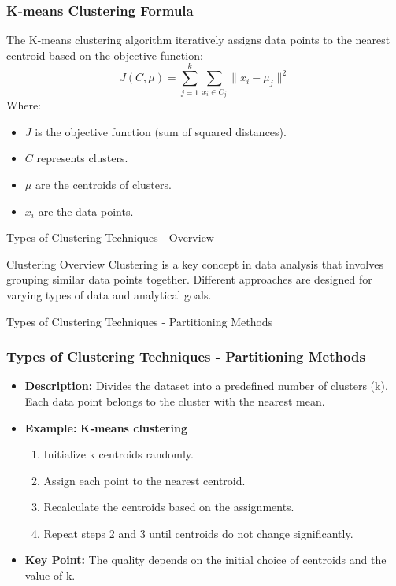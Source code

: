 \documentclass[aspectratio=169]{beamer}
\begin{document}
\begin{frame}[fragile]
    \frametitle{K-means Clustering Formula}
    The K-means clustering algorithm iteratively assigns data points to the nearest centroid based on the objective function:
    \begin{equation}
        J(C, \mu) = \sum_{j=1}^{k}\sum_{x_i \in C_j} \| x_i - \mu_j \|^2
    \end{equation}
    Where:
    \begin{itemize}
        \item $ J $ is the objective function (sum of squared distances).
        \item $ C $ represents clusters.
        \item $ \mu $ are the centroids of clusters.
        \item $ x_i $ are the data points.
    \end{itemize}
\end{frame}

\begin{frame}[fragile]{Types of Clustering Techniques - Overview}
    \begin{block}{Clustering Overview}
        Clustering is a key concept in data analysis that involves grouping similar data points together. 
        Different approaches are designed for varying types of data and analytical goals. 
    \end{block}
\end{frame}

\begin{frame}[fragile]{Types of Clustering Techniques - Partitioning Methods}
    \frametitle{Types of Clustering Techniques - Partitioning Methods}
    \begin{itemize}
        \item \textbf{Description:} Divides the dataset into a predefined number of clusters (k). 
        Each data point belongs to the cluster with the nearest mean.
        \item \textbf{Example:} \textbf{K-means clustering}
            \begin{enumerate}
                \item Initialize k centroids randomly.
                \item Assign each point to the nearest centroid.
                \item Recalculate the centroids based on the assignments.
                \item Repeat steps 2 and 3 until centroids do not change significantly.
            \end{enumerate}
        \item \textbf{Key Point:} The quality depends on the initial choice of centroids and the value of k.
    \end{itemize}
\end{frame}
\end{document}
